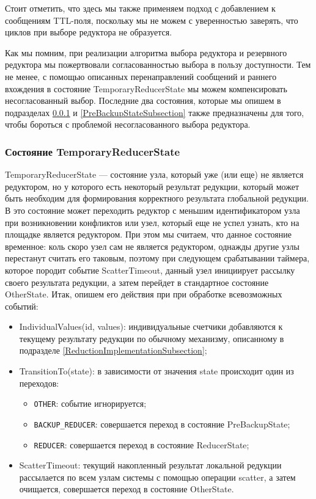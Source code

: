 \documentclass{article}
\theoremstyle{plain}
\theoremstyle{plain}
\theoremstyle{plain}
\theoremstyle{plain}
\theoremstyle{definition}
\theoremstyle{remark}
\theoremstyle{plain}
\begin{document}
Стоит отметить, что здесь мы также применяем подход с добавлением к сообщениям TTL-поля, поскольку мы не можем с уверенностью заверять, что циклов при выборе редуктора не образуется.

Как мы помним, при реализации алгоритма выбора редуктора и резервного редуктора мы пожертвовали согласованностью выбора в пользу доступности. Тем не менее, с помощью описанных перенаправлений сообщений и раннего вхождения в состояние TemporaryReducerState мы можем компенсировать несогласованный выбор. Последние два состояния, которые мы опишем в подразделах \ref{TemporaryReducerStateSubsection} и \ref{PreBackupStateSubsection} также предназначены для того, чтобы бороться с проблемой несогласованного выбора редуктора.

\subsubsection{Состояние TemporaryReducerState}
\label{TemporaryReducerStateSubsection}

TemporaryReducerState --- состояние узла, который уже (или еще) не является редуктором, но у которого есть некоторый результат редукции, который может быть необходим для формирования корректного результата глобальной редукции. В это состояние может переходить редуктор с меньшим идентификатором узла при возникновении конфликтов или узел, который еще не успел узнать, кто на площадке является редуктором. При этом мы считаем, что данное состояние временное: коль скоро узел сам не является редуктором, однажды другие узлы перестанут считать его таковым, поэтому при следующем срабатывании таймера, которое породит событие ScatterTimeout, данный узел инициирует рассылку своего результата редукции, а затем перейдет в стандартное состояние OtherState. Итак, опишем его действия при при обработке всевозможных событий:

\begin{itemize}
    \item IndividualValues(id, values): индивидуальные счетчики добавляются к текущему результату редукции по обычному механизму, описанному в подразделе \ref{ReductionImplementationSubsection};
    
    \item TransitionTo(state): в зависимости от значения state происходит один из переходов:
        
        \begin{itemize}
            \item \texttt{OTHER}: событие игнорируется;
            \item \texttt{BACKUP\_REDUCER}: совершается переход в состояние PreBackupState;
            \item \texttt{REDUCER}: совершается переход в состояние ReducerState;
        \end{itemize}
        
    \item ScatterTimeout: текущий накопленный результат локальной редукции рассылается по всем узлам системы с помощью операции scatter, а затем очищается, совершается переход в состояние OtherState.
\end{itemize}
\end{document}
